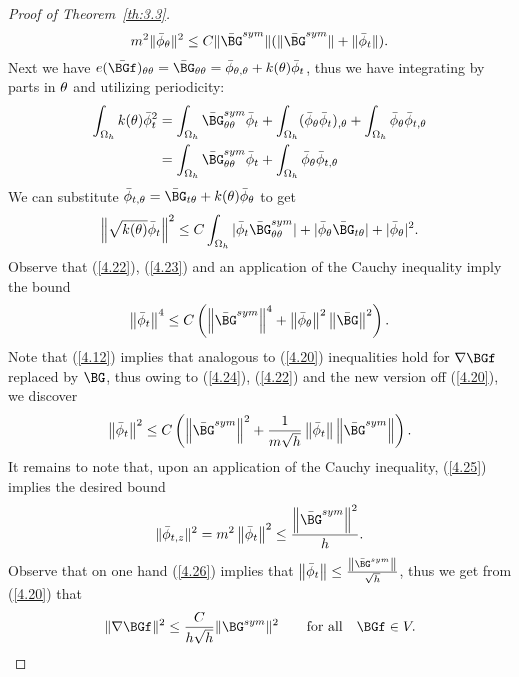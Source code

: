 \begin{proof}[Proof of Theorem~{\ref{th:3.3}}]
\begin{equation}
\label{4.22}
m^2\|\bar\phi_{\Gth}\|^2\leq C\|\bar \BG^{sym}\|(\|\bar \BG^{sym}\|+\|\bar \phi_t\|).
\end{equation}
Next we have $e(\bar \BGf)_{\theta\theta}=\bar\BG_{\Gth\Gth}=\bar\phi_{\theta,\theta}+k(\theta)\bar\phi_t$, thus we have integrating by parts in $\theta$ and utilizing periodicity: 
\begin{align*}
\int_{\Omega_h} k(\theta) \bar\phi_t^2&= \int_{\Omega_h} \bar\BG^{sym}_{\theta\theta} \bar\phi_t+\int_{\Omega_h}  (\bar\phi_\theta \bar\phi_t)_{,\theta}
+\int_{\Omega_h} \bar\phi_\theta \bar\phi_{t,\theta}\\
&=\int_{\Omega_h} \bar\BG^{sym}_{\theta\theta} \bar\phi_t+\int_{\Omega_h} \bar\phi_\theta \bar\phi_{t,\theta}\\
\end{align*}
We can substitute $\bar\phi_{t,\theta}=\bar\BG_{t\theta}+k(\theta)\bar\phi_\theta$ to get
\begin{equation}
\label{4.23}
\norm{\sqrt{k(\theta)}\bar\phi_t}^2\leq C\int_{\Omega_h} |\bar\phi_t \bar\BG^{sym}_{\theta\theta}|+|\bar\phi_\theta \bar\BG_{t\theta}|+|\bar\phi_\theta|^2.
\end{equation}
Observe that (\ref{4.22}), (\ref{4.23}) and an application of the Cauchy inequality imply the bound
\begin{equation}
\label{4.24}
\norm{\bar\phi_t}^4 \leq C\left(\norm{\bar\BG^{sym}}^4+\norm{\bar\phi_\theta}^2\norm{\bar\BG}^2\right).
\end{equation}
Note that (\ref{4.12}) implies that analogous to (\ref{4.20}) inequalities hold for $\nabla\BGf$ replaced by $\BG$, thus owing to (\ref{4.24}), (\ref{4.22}) and the new version off (\ref{4.20}), we discover 
\begin{equation}
\label{4.25}
\norm{\bar\phi_t}^2\leq C\left(\norm{\bar\BG^{sym}}^2+\frac{1}{m\sqrt{h}}\norm{\bar\phi_t}\norm{\bar\BG^{sym}}\right).
\end{equation}
It remains to note that, upon an application of the Cauchy inequality, (\ref{4.25}) implies the desired bound
\begin{equation}
\label{4.26}
\|\bar \phi_{t,z}\|^2=m^2\norm{\bar \phi_t}^2\leq \frac{\norm{\bar \BG^{sym}}^2}{h}.
\end{equation}
Observe that on one hand (\ref{4.26}) implies that $\norm{\bar \phi_t}\leq \frac{\norm{\bar \BG^{sym}}}{\sqrt{h}}$, thus we get from (\ref{4.20}) that
\begin{equation}
\label{4.27}
\|\nabla\BGf\|^2\leq \frac{C}{h\sqrt{h}}\|\BG^{sym}\|^2 \qquad\text{for all}\quad \BGf\in V.

\end{equation}
\end{proof}
